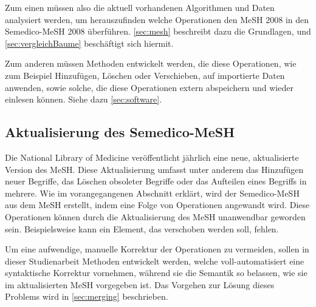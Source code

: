 Zum einen müssen also die aktuell vorhandenen Algorithmen und Daten analysiert werden, um herauszufinden welche Operationen den MeSH 2008 in den Semedico-MeSH 2008 überführen. \ref{sec:mesh} \textit{} beschreibt dazu die Grundlagen, und \ref{sec:vergleichBaume} \textit{} beschäftigt sich hiermit. \par

Zum anderen müssen Methoden entwickelt werden, die diese Operationen, wie zum Beispiel Hinzufügen, Löschen oder Verschieben, auf importierte Daten anwenden, sowie solche, die diese Operationen extern abspeichern und wieder einlesen können. Siehe dazu \autoref{sec:software}.\par

\subsection*{Aktualisierung des Semedico-MeSH}
\label{sec:aktualisierung_semedico} 
Die National Library of Medicine veröffentlicht jährlich eine neue, aktualisierte Version des MeSH. Diese Aktualisierung umfasst unter anderem das Hinzufügen neuer Begriffe, das Löschen obsoleter Begriffe oder das Aufteilen eines Begriffs in mehrere. Wie im vorangegangenen Abschnitt erklärt, wird der Semedico-MeSH aus dem MeSH erstellt, indem eine Folge von Operationen angewandt wird. Diese Operationen können durch die Aktualisierung des MeSH unanwendbar geworden sein. Beispielsweise kann ein Element, das verschoben werden soll, fehlen. \par

Um eine aufwendige, manuelle Korrektur der Operationen zu vermeiden, sollen in dieser Studienarbeit Methoden entwickelt werden, welche voll-automatisiert eine syntaktische Korrektur vornehmen, während sie die Semantik so belassen, wie sie im aktualisierten MeSH vorgegeben ist. Das Vorgehen zur Lösung dieses Problems wird in \autoref{sec:merging} \textit{} beschrieben.

